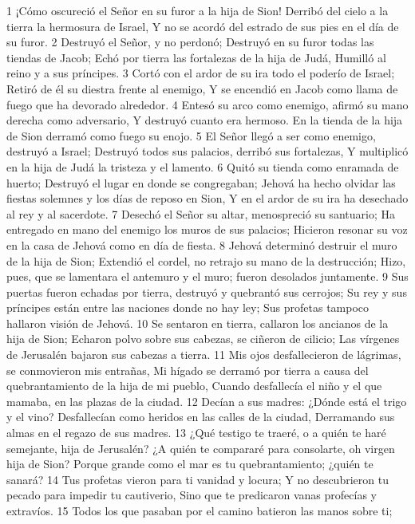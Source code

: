 1 ¡Cómo oscureció el Señor en su furor a la hija de Sion!
Derribó del cielo a la tierra la hermosura de Israel,
Y no se acordó del estrado de sus pies en el día de su furor.
2 Destruyó el Señor, y no perdonó;
Destruyó en su furor todas las tiendas de Jacob;
Echó por tierra las fortalezas de la hija de Judá, 
Humilló al reino y a sus príncipes.
3 Cortó con el ardor de su ira todo el poderío de Israel;
Retiró de él su diestra frente al enemigo,
Y se encendió en Jacob como llama de fuego que ha devorado alrededor.
4 Entesó su arco como enemigo, afirmó su mano derecha como adversario,
Y destruyó cuanto era hermoso.
En la tienda de la hija de Sion derramó como fuego su enojo.
5 El Señor llegó a ser como enemigo, destruyó a Israel;
Destruyó todos sus palacios, derribó sus fortalezas,
Y multiplicó en la hija de Judá la tristeza y el lamento.
6 Quitó su tienda como enramada de huerto; 
Destruyó el lugar en donde se congregaban;
Jehová ha hecho olvidar las fiestas solemnes y los días de reposo en Sion,
Y en el ardor de su ira ha desechado al rey y al sacerdote.
7 Desechó el Señor su altar, menospreció su santuario;
Ha entregado en mano del enemigo los muros de sus palacios;
Hicieron resonar su voz en la casa de Jehová como en día de fiesta.
8 Jehová determinó destruir el muro de la hija de Sion;
Extendió el cordel, no retrajo su mano de la destrucción;
Hizo, pues, que se lamentara el antemuro y el muro; fueron desolados juntamente.
9 Sus puertas fueron echadas por tierra, destruyó y quebrantó sus cerrojos;
Su rey y sus príncipes están entre las naciones donde no hay ley;
Sus profetas tampoco hallaron visión de Jehová.
10 Se sentaron en tierra, callaron los ancianos de la hija de Sion;
Echaron polvo sobre sus cabezas, se ciñeron de cilicio;
Las vírgenes de Jerusalén bajaron sus cabezas a tierra.
11 Mis ojos desfallecieron de lágrimas, se conmovieron mis entrañas,
Mi hígado se derramó por tierra a causa del quebrantamiento de la hija de mi pueblo,
Cuando desfallecía el niño y el que mamaba, en las plazas de la ciudad.
12 Decían a sus madres: ¿Dónde está el trigo y el vino?
Desfallecían como heridos en las calles de la ciudad,
Derramando sus almas en el regazo de sus madres.
13 ¿Qué testigo te traeré, o a quién te haré semejante, hija de Jerusalén?
¿A quién te compararé para consolarte, oh virgen hija de Sion?
Porque grande como el mar es tu quebrantamiento; ¿quién te sanará?
14 Tus profetas vieron para ti vanidad y locura;
Y no descubrieron tu pecado para impedir tu cautiverio,
Sino que te predicaron vanas profecías y extravíos.
15 Todos los que pasaban por el camino batieron las manos sobre ti;
